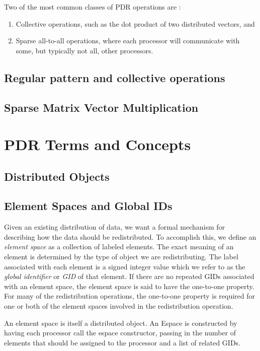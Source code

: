 \documentclass[12pt,relax]{OODataRedistribution}
\begin{document}
Two of the most common classes of PDR operations are :
\begin{enumerate}
\item Collective operations, such as the dot
product of two distributed vectors, and 
\item Sparse all-to-all operations, where each processor will
communicate with some, but typically not all, other processors.
\end{enumerate}


\subsection{Regular pattern and collective operations}

\subsection{Sparse Matrix Vector Multiplication}

\section{PDR Terms and Concepts}
\label{sect:concepts}

\subsection{Distributed Objects}

\subsection{Element Spaces and Global IDs}

Given an existing distribution of data, we want a formal mechanism for describing
how the data should be redistributed.  To accomplish this, we define an 
{\it element space} as a collection of labeled elements.  The exact meaning of
an element is determined by the type of object we are redistributing.
The label associated with each element is a signed integer value which we refer to as
the {\it global identifier} or {\it GID} of that element.  If there are no 
repeated GIDs associated with an element space, the element space is said to 
have the one-to-one property.  For many of the redistribution operations, the
one-to-one property is required for one or both of the element spaces involved
in the redistribution operation.

An element space is itself a distributed object.  An Espace is constructed by 
having each processor call the espace constructor, passing in the number of
elements that should be assigned to the processor and a list of related GIDs.
\end{document}
